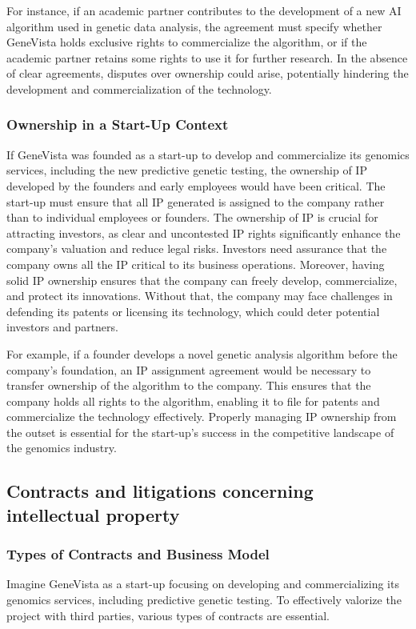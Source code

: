 \documentclass[a4paper]{article}
\begin{document}
For instance, if an academic partner contributes to the development of a new AI algorithm used in genetic data analysis, the agreement must specify whether GeneVista holds exclusive rights to commercialize the algorithm, or if the academic partner retains some rights to use it for further research. In the absence of clear agreements, disputes over ownership could arise, potentially hindering the development and commercialization of the technology.

\subsubsection{Ownership in a Start-Up Context}

If GeneVista was founded as a start-up to develop and commercialize its genomics services, including the new predictive genetic testing, the ownership of IP developed by the founders and early employees would have been critical. The start-up must ensure that all IP generated is assigned to the company rather than to individual employees or founders. The ownership of IP is crucial for attracting investors, as clear and uncontested IP rights significantly enhance the company’s valuation and reduce legal risks. Investors need assurance that the company owns all the IP critical to its business operations. Moreover, having solid IP ownership ensures that the company can freely develop, commercialize, and protect its innovations. Without that, the company may face challenges in defending its patents or licensing its technology, which could deter potential investors and partners.

For example, if a founder develops a novel genetic analysis algorithm before the company's foundation, an IP assignment agreement would be necessary to transfer ownership of the algorithm to the company. This ensures that the company holds all rights to the algorithm, enabling it to file for patents and commercialize the technology effectively. Properly managing IP ownership from the outset is essential for the start-up’s success in the competitive landscape of the genomics industry.

\subsection{Contracts and litigations concerning intellectual property}

\subsubsection{Types of Contracts and Business Model}
Imagine GeneVista as a start-up focusing on developing and commercializing its genomics services, including predictive genetic testing. To effectively valorize the project with third parties, various types of contracts are essential. 
\end{document}
